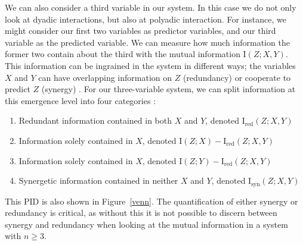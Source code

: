\documentclass[../main.tex]{subfiles}
\begin{document}
We can also consider a third variable in our system.
In this case we do not only look at dyadic interactions, but also at polyadic interaction.
For instance, we might consider our first two variables as predictor variables, and our third variable as the predicted variable.
We can measure how much information the former two contain about the third with the mutual information $\mathrm{I} \left( Z;X,Y \right)$.
This information can be ingrained in the system in different ways; the variables $X$ and $Y$ can have overlapping information on $Z$ (redundancy) or cooperate to predict $Z$ (synergy) \cite{griffith2014quantifying}.
For our three-variable system, we can split information at this emergence level into four categories \cite{williams2010nonnegative}: %
%
\begin{enumerate}
\item Redundant information contained in both $X$ and $Y$, denoted $\mathrm{I}_\mathrm{red} \left( Z;X,Y \right)$
\item Information solely contained in $X$, denoted $\mathrm{I}\left(Z; X \right) - \mathrm{I}_\mathrm{red}(Z;X,Y)$
\item Information solely contained in $X$, denoted $\mathrm{I}\left(Z; Y \right) - \mathrm{I}_\mathrm{red}\left( Z;X,Y \right)$
\item Synergetic information contained in neither $X$ and $Y$, denoted $\mathrm{I}_\mathrm{syn}\left( Z;X,Y \right)$
\end{enumerate}
This PID is also shown in Figure~\ref{venn}.
The quantification of either synergy or redundancy is critical, as without this it is not possible to discern between synergy and redundancy when looking at the mutual information in a system with $n \ge 3$.

\def\firstcircle{(0:-0.9cm) circle (2cm)}
\def\secondcircle{(0:0cm) circle (3cm)}
\def\thirdcircle{(0:0.9cm) circle (2cm)}
\end{document}
